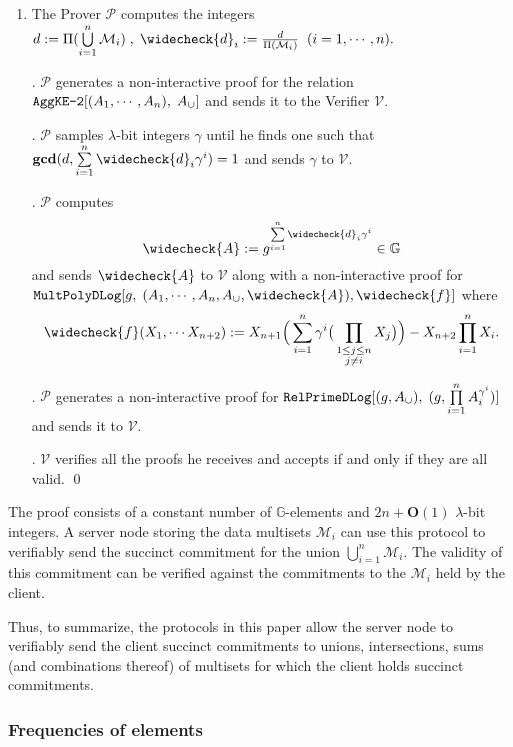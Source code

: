 \documentclass[11pt, lettersize, notitlepage, leqno, footskip=0.6cm]{article}
\newcommand{\pl}{\prod\limits}
\newcommand{\slim}{\sum\limits}
\newcommand{\ttt}{\texttt}
\newcommand{\bG}{\mathbb{G}}
\newcommand{\mc}{\mathcal}
\newcommand{\mbf}{\mathbf}
\newcommand{\lam}{\lambda}
\newcommand{\weck}{\widecheck}
\newcommand{\bO}{\mbf{O}}
\newcommand{\mP}{\mc{P}}
\newcommand{\V}{\mc{V}}
\newcommand{\mcM}{\mc{M}}
\newcommand{\vs}{\vspace{-0.15cm}}
\newcommand{\noin}{\noindent}
\newcommand{\GCD}{\mbf{gcd}}
\numberwithin{equation}{section}
\begin{document}
\begin{enumerate}[wide, labelwidth=!, labelindent=0pt]\vs \item The Prover $\mP$ computes the integers $d:= \Pi(\bigcup\limits_{i=1}^n \mc{M}_i)\;,\;\weck{d}_i:= \frac{d}{\Pi(\mcM_i)}\;\;(i=1,\cdots,n).$

\noin 2. $\mP$ generates a non-interactive proof for the relation $\ttt{AggKE-2}[(A_1,\cdots,A_n),\;A_{\tt{\cup}}]$ and sends it to the Verifier $\V$.


\noin 3. $\mP$ samples $\lam$-bit integers $\gamma$ until he finds one such that $ \GCD(d, \slim_{i=1}^n \weck{d}_i\gamma^i) =1$ and sends $\gamma$ to $\V$.

\noin 4. $\mP$ computes \vs $$\weck{A}:= g^{\slim_{i=1}^n \weck{d}_i\gamma^i}\in\bG$$ and sends $\weck{A}$ to $\V$ along with a non-interactive proof for $\ttt{MultPolyDLog}[g,\;(A_1,\cdots, A_n, A_{\tt{\cup}}, \weck{A}), \weck{f}]$ where \vs $$\weck{f}(X_1,\cdots X_{n+2}):= X_{n+1}\Big(\slim_{i=1}^n \gamma^i\big(\pl_{\substack{1\leq j\leq n\\ j\neq i}} X_j\big)\Big) - X_{n+2}\pl_{i=1}^n X_i.$$\vs

\noin 5. $\mP$ generates a non-interactive proof for $\ttt{RelPrimeDLog}[(g, A_{\tt{\cup}}),\;(g, \pl_{i=1}^n A_i^{\gamma^i})]$ and sends it to $\V$.

\noin 6. $\V$ verifies all the proofs he receives and accepts if and only if they are all valid. \qed \end{enumerate}

\noin The proof consists of a constant number of $\bG$-elements and $2n+\bO(1)$ $\lam$-bit integers. A server node storing the data multisets $\mcM_i$ can use this protocol to verifiably send the succinct commitment for the union $\bigcup_{i=1}^n \mcM_i$. The validity of this commitment can be verified against the commitments to the $\mcM_i$ held by the client.

\vspace{0.2cm}

Thus, to summarize, the protocols in this paper allow the server node to verifiably send the client succinct commitments to unions, intersections, sums (and combinations thereof) of multisets for which the client holds succinct commitments.  

\subsubsection{\fontsize{11}{11} \selectfont Frequencies of elements}
\end{document}
